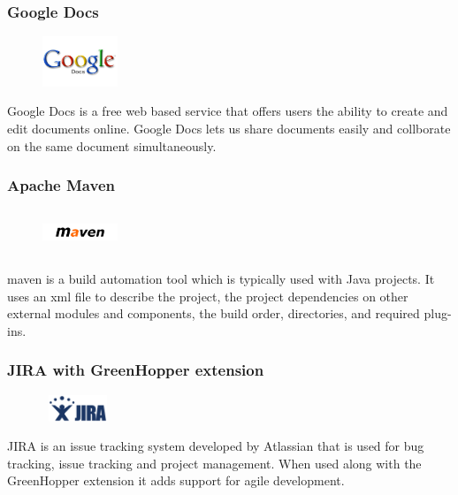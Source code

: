\subsubsection{Google Docs}
\begin{figure}
  \vspace{-115pt}
  \begin{center}
    \includegraphics[width=0.2\textwidth]{GoogleDocs}
  \end{center}

\end{figure}
Google Docs is a free web based service that offers users the ability to create and edit documents online. Google Docs lets us share documents easily  and \newline collborate on the same document simultaneously.	

\subsubsection{Apache Maven}
\begin{figure}
  \vspace{-35pt}
  \begin{center}
    \includegraphics[width=0.2\textwidth, height=50px]{Maven}
  \end{center}

\end{figure}
\gls{maven} is a build automation tool which is typically used with Java projects. It uses an \gls{xml} file to describe the project, the project dependencies on other external modules and components, the build order, directories, and required plug-ins.   

\subsubsection{JIRA with GreenHopper extension}
\begin{figure}
  \vspace{-40pt}
  \begin{center}
    \includegraphics[width=80px,height=30px]{Jira}
  \end{center}

\end{figure}
JIRA is an issue tracking system developed by Atlassian that is used for bug tracking, issue tracking and project management. When used along with the GreenHopper extension it adds support for agile development.\cite{bib:atlassian}

